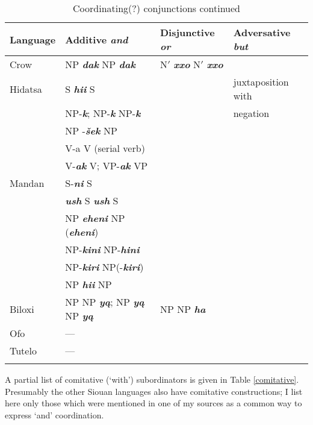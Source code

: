 \documentclass[output=paper]{LSP/langsci}
\begin{document}
\begin{table}
\caption{Coordinating(?) conjunctions continued} \label{morecoord}
\small
\begin{tabular}{ l  l  l  l  }
\lsptoprule
Language & Additive \textbf{\textit{and}} & Disjunctive \textbf{\textit{or}} & Adversative \textbf{\textit{but}} \\
\midrule  \vspace{1em}
Crow & NP \textbf{\textit{dak}} NP \textbf{\textit{dak}} & N$'$ \textbf{\textit{xxo}} N$'$ \textbf{\textit{xxo}} &  \\

Hidatsa & S \textbf{\textit{hii}} S &   & juxtaposition with  \\
& NP-\textbf{\textit{k}}; NP-\textbf{\textit{k}} NP-\textbf{\textit{k}} & & negation \\
& NP -\textbf{\textit{\v{s}ek}} NP & & \\
& V-a V (serial verb) & & \\ \vspace{1em}
& V-\textbf{\textit{ak}} V; VP-\textbf{\textit{ak}} VP & & \\

Mandan & S-\textbf{\textit{ni}} S &   & \\
& \textbf{\textit{ush}} S \textbf{\textit{ush}} S & & \\
& NP \textbf{\textit{eheni}} NP (\textbf{\textit{eheni}}) & & \\
& NP-\textbf{\textit{kini}} NP-\textbf{\textit{hini}} & & \\
& NP-\textbf{\textit{kiri}} NP(-\textbf{\textit{kiri}}) & & \\ \vspace{1em}
& NP \textbf{\textit{hii}} NP & & \\
 \vspace{1em}
Biloxi & NP NP \textbf{\textit{y\k{a}}}; NP \textbf{\textit{y\k{a}}} NP \textbf{\textit{y\k{a}}} & NP NP \textbf{\textit{ha}} & \\
 \vspace{1em}
Ofo	 & --- & & \\

Tutelo & ---  & & \\
\lspbottomrule
\end{tabular}  
\end{table}

A partial list of comitative (`with') subordinators is given in Table \ref{comitative}.  Presumably the other Siouan languages also have comitative constructions; I list here only those which were mentioned in one of my sources as a common way to express `and' coordination.
 
\end{document}
